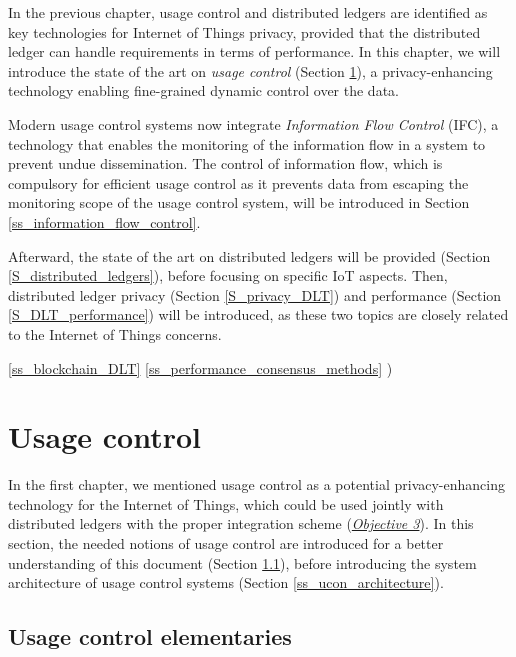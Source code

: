 \minitoc
In the previous chapter, usage control and distributed ledgers are identified as key technologies for Internet of Things privacy, provided that the distributed ledger can handle requirements in terms of performance. In this chapter, we will introduce the state of the art on \emph{usage control} (Section \ref{S_usage_control}), a privacy-enhancing technology enabling fine-grained dynamic control over the data.

Modern usage control systems now integrate \emph{Information Flow Control} (IFC), a technology that enables the monitoring of the information flow in a system to prevent undue dissemination. The control of information flow, which is compulsory for efficient usage control as it prevents data from escaping the monitoring scope of the usage control system, will be introduced in Section \ref{ss_information_flow_control}. 

Afterward, the state of the art on distributed ledgers will be provided (Section \ref{S_distributed_ledgers}), before focusing on specific IoT aspects. 
Then, distributed ledger privacy (Section \ref{S_privacy_DLT}) and performance (Section \ref{S_DLT_performance}) will be introduced, 
as these two topics are closely related to the Internet of Things concerns.

 \ref{ss_blockchain_DLT}  \ref{ss_performance_consensus_methods} )
\section{Usage control}
\label{S_usage_control}

In the first chapter, we mentioned usage control as a potential privacy-enhancing technology for the Internet of Things, which could be used jointly with distributed ledgers with the proper integration scheme (\hyperref[obj:23]{\emph{Objective 3}}). In this section, the needed notions of usage control are introduced for a better understanding of this document (Section \ref{ss_ucon_elementaries}), before introducing the system architecture of usage control systems (Section \ref{ss_ucon_architecture}). 
\subsection{Usage control elementaries}
\label{ss_ucon_elementaries}

